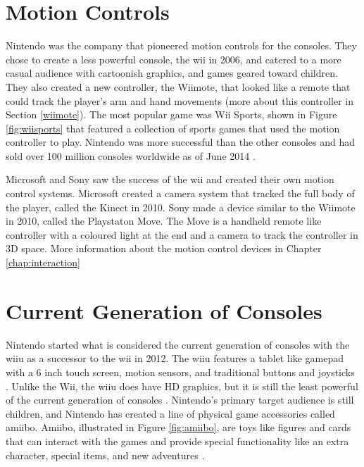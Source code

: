 
\section{Motion Controls}
Nintendo was the company that pioneered motion controls for the consoles. They chose to create a less powerful console, the \gls{wii} in 2006, and catered to a more casual audience with cartoonish graphics, and games geared toward children. They also created a new controller, the Wiimote, that looked like a remote that could track the player's arm and hand movements (more about this controller in Section \ref{wiimote}). The most popular game was Wii Sports, shown in Figure \ref{fig:wiisports} that featured a collection of sports games that used the motion controller to play. Nintendo was more successful than the other consoles and had sold over 100 million consoles worldwide as of June 2014 \cite{2014nintendo}.

Microsoft and Sony saw the success of the \gls{wii} and created their own motion control systems. Microsoft created a camera system that tracked the full body of the player, called the Kinect in 2010. Sony made a device similar to the Wiimote in 2010, called the Playstaton Move. The Move is a handheld remote like controller with a coloured light at the end and a camera to track the controller in 3D space. More information about the motion control devices in Chapter \ref{chap:interaction}


\section{Current Generation of Consoles}
Nintendo started what is considered the current generation of consoles with the \gls{wiiu} as a successor to the \gls{wii} in 2012. The \gls{wiiu} features a tablet like gamepad with a 6 inch touch screen, motion sensors, and traditional buttons and joysticks \cite{2015wiiu}. Unlike the Wii, the \gls{wiiu} does have HD graphics, but it is still the least powerful of the current generation of consoles \cite{2015ign}. Nintendo's primary target audience is still children, and Nintendo has created a line of physical game accessories called amiibo. Amiibo, illustrated in Figure \ref{fig:amiibo}, are toys like figures and cards that can interact with the games and provide special functionality like an extra character, special items, and new adventures \cite{2015amiibo}. 

